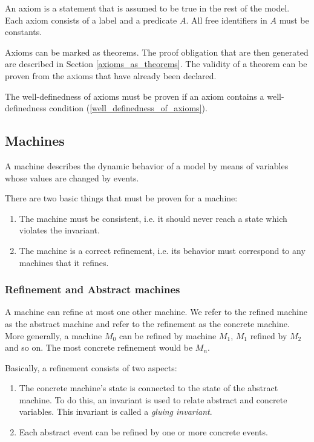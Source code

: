 An axiom is a statement that is assumed to be true in the rest of the model.
Each axiom consists of a label and a predicate $A$.
All free identifiers in $A$ must be constants.

Axioms can be marked as theorems. The proof obligation that are then generated are described in Section \ref{axioms_as_theorems}.
The validity of a theorem can be proven from the axioms that have already been declared.

The well-definedness of axioms must be proven if an axiom contains a well-definedness condition (\ref{well_definedness_of_axioms}).

\subsection{Machines}
\label{machine}

A machine describes the dynamic behavior of a model by means of variables whose values are changed by events.

There are two basic things that must be proven for a machine:
\begin{enumerate}
	\item The machine must be consistent, i.e. it should never reach a state which violates the invariant.
	\item The machine is a correct refinement, i.e. its behavior must correspond to any machines that it refines.
\end{enumerate}

\subsubsection{Refinement and Abstract machines}
\label{abstract_machine}

A machine can refine at most one other machine. 
We refer to the refined machine as the abstract machine and refer to the refinement as the concrete machine. 
More generally, a machine $M_0$ can be refined by machine $M_1$, $M_1$ refined by $M_2$ 
and so on. The most concrete refinement would be $M_n$. 

Basically, a refinement consists of two aspects:
\begin{enumerate}
	\item The concrete machine's state is connected to the state of the
      abstract machine. To do this, an invariant is used to relate abstract and concrete variables. 
      This invariant is called a \emph{gluing invariant}. 
	\item Each abstract event can be refined by one or more
concrete events.
\end{enumerate}

